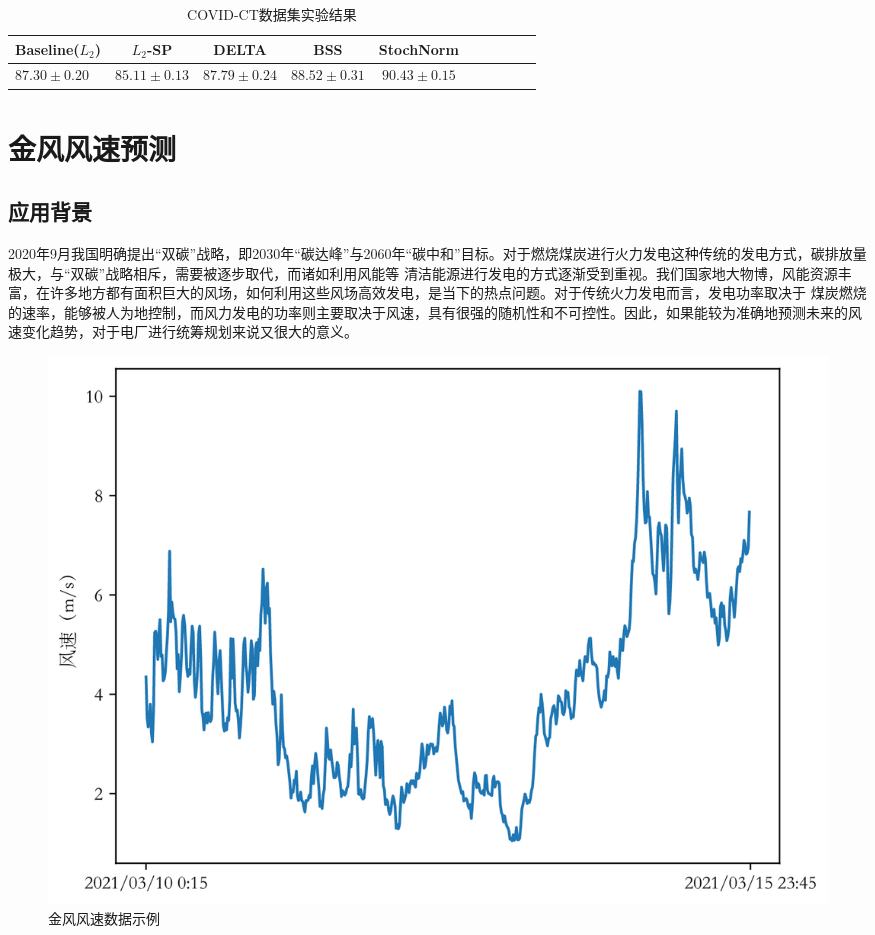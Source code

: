 \begin{table}[h]
	\begin{center}
  \caption{COVID-CT数据集实验结果}
	\label{table:covid-ct}
    \begin{tabular}{lccccccccc}
        \toprule
        Baseline($L_2$) & $L_2$-SP \citep{xuhong2018explicit} & DELTA \citep{li2018delta} & BSS \citep{chen2019catastrophic} &  \textbf{StochNorm}\\
        \midrule
        $87.30\pm0.20$ & $85.11\pm0.13$ & $87.79\pm0.24$ & $88.52\pm0.31$ & $90.43\pm0.15$\\
        \bottomrule
    \end{tabular}
	\end{center}
\end{table}

\section{金风风速预测}

\subsection{应用背景}

2020年9月我国明确提出“双碳”战略，即2030年“碳达峰”与2060年“碳中和”目标。对于燃烧煤炭进行火力发电这种传统的发电方式，碳排放量极大，与“双碳”战略相斥，需要被逐步取代，而诸如利用风能等
清洁能源进行发电的方式逐渐受到重视。我们国家地大物博，风能资源丰富，在许多地方都有面积巨大的风场，如何利用这些风场高效发电，是当下的热点问题。对于传统火力发电而言，发电功率取决于
煤炭燃烧的速率，能够被人为地控制，而风力发电的功率则主要取决于风速，具有很强的随机性和不可控性。因此，如果能较为准确地预测未来的风速变化趋势，对于电厂进行统筹规划来说又很大的意义。

\begin{figure}
  \centering
  \includegraphics[width=0.75\linewidth]{figures/wind.png}
  \caption{金风风速数据示例}
  \label{fig:goldwind}
\end{figure}

